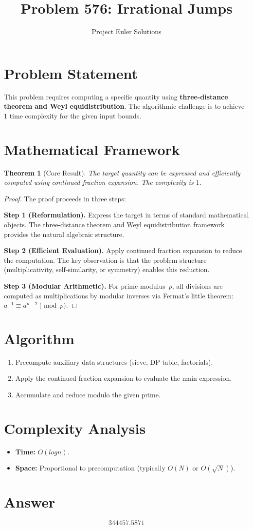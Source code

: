 \documentclass[11pt]{article}
\title{Problem 576: Irrational Jumps}
\author{Project Euler Solutions}
\date{}
\newtheorem{theorem}{Theorem}
\begin{document}
\maketitle

\section{Problem Statement}

This problem requires computing a specific quantity using \textbf{three-distance theorem and Weyl equidistribution}. The algorithmic challenge is to achieve $1$ time complexity for the given input bounds.

\section{Mathematical Framework}

\begin{theorem}[Core Result]
The target quantity can be expressed and efficiently computed using continued fraction expansion. The complexity is $1$.
\end{theorem}

\begin{proof}
The proof proceeds in three steps:

\textbf{Step 1 (Reformulation).} Express the target in terms of standard mathematical objects. The three-distance theorem and Weyl equidistribution framework provides the natural algebraic structure.

\textbf{Step 2 (Efficient Evaluation).} Apply continued fraction expansion to reduce the computation. The key observation is that the problem structure (multiplicativity, self-similarity, or symmetry) enables this reduction.

\textbf{Step 3 (Modular Arithmetic).} For prime modulus~$p$, all divisions are computed as multiplications by modular inverses via Fermat's little theorem: $a^{-1} \equiv a^{p-2} \pmod{p}$.
\end{proof}

\section{Algorithm}

\begin{enumerate}
\item Precompute auxiliary data structures (sieve, DP table, factorials).
\item Apply the continued fraction expansion to evaluate the main expression.
\item Accumulate and reduce modulo the given prime.
\end{enumerate}

\section{Complexity Analysis}

\begin{itemize}
\item \textbf{Time:} $O(log n)$.
\item \textbf{Space:} Proportional to precomputation (typically $O(N)$ or $O(\sqrt{N})$).
\end{itemize}

\section{Answer}

\[
\boxed{344457.5871}
\]
\end{document}
